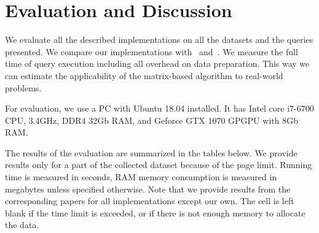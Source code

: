 \section{Evaluation and Discussion}

We evaluate all the described implementations on all the datasets and the queries presented.
We compare our implementations with~\cite{Mishin:2019:ECP:3327964.3328503} and~\cite{Kuijpers:2019:ESC:3335783.3335791}.
We measure the full time of query execution including all overhead on data preparation.
This way we can estimate the applicability of the matrix-based algorithm to real-world problems.

For evaluation, we use a PC with Ubuntu 18.04 installed.
It has Intel core i7-6700 CPU, 3.4GHz, DDR4 32Gb RAM, and Geforce GTX 1070 GPGPU with 8Gb RAM.

The results of the evaluation are summarized in the tables below.
We provide results only for a part of the collected dataset because of the page limit.
Running time is measured in seconds, RAM memory consumption is measured in megabytes unless specified otherwise.
Note that we provide results from the corresponding papers for all implementations except our own.
The cell is left blank if the time limit is exceeded, or if there is not enough memory to allocate the data.

